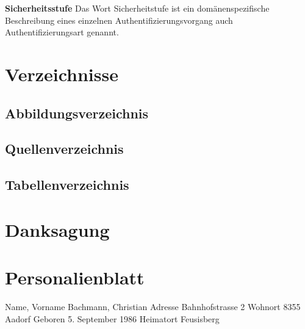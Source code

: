 \textbf{Sicherheitsstufe} Das Wort Sicherheitstufe ist ein
domänenspezifische Beschreibung eines einzelnen
Authentifizierungsvorgang auch Authentifizierungsart genannt.

\chapter{Verzeichnisse}\label{verzeichnisse}

\section{Abbildungsverzeichnis}\label{abbildungsverzeichnis}

\renewcommand{\listfigurename}{} 

\begingroup\let\clearpage\relax
\listoffigures
\endgroup

\pagebreak

\section{Quellenverzeichnis}\label{quellenverzeichnis}

\renewcommand{\bibname}{}

\begingroup \let\clearpage\relax
\printbibliography
\endgroup

\pagebreak

\section{Tabellenverzeichnis}\label{tabellenverzeichnis}

\renewcommand{\listtablename}{} 

\begingroup \let\clearpage\relax
\listoftables
\endgroup

\newpage

\chapter{Danksagung}\label{danksagung}

\newpage

\chapter{Personalienblatt}\label{personalienblatt}

Name, Vorname Bachmann, Christian Adresse Bahnhofstrasse 2 Wohnort 8355
Aadorf Geboren 5. September 1986 Heimatort Feusisberg

